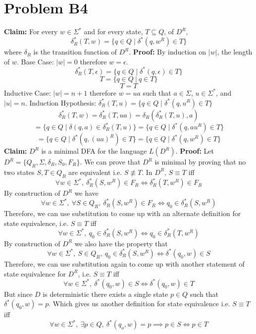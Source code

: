 \documentclass[12pt]{article}
\begin{document}
\section*{Problem B4}
\textbf{Claim: } For every $w \in \Sigma^*$ and for every state, $T\subseteq Q$,
of $D^R$,
$$\delta_R^*(T, w) = \{q\in Q \mid \delta^*(q, w^R) \in T\}$$
where $\delta_R$ is the transition function of $D^R$.
\newline
\textbf{Proof: } By induction on $|w|$, the length of $w$.
\newline
Base Case: $|w|= 0$ therefore $w = \epsilon$.
$$\delta_R^*(T, \epsilon) = \{q\in Q \mid \delta^*(q, \epsilon) \in T\}$$
$$T = \{q \in Q\ |\ q \in T\}$$
$$T = T$$
\newline
Inductive Case: $|w| = n+1$ therefore $w = ua$ such that $a \in \Sigma$,
$u \in \Sigma^*$, and $|u| = n$.
Induction Hypothesis: $\delta_R^*(T, u) = \{q\in Q \mid \delta^*(q, u^R) \in T\}$
$$\delta_R^*(T, w) = \delta_R^*(T, ua) = \delta_R(\delta_R^*(T,u),a)$$
$$= \{q \in Q \mid \delta(q,a) \in \delta_R^*(T,u)\} =
\{q\in Q \mid \delta^*(q, au^R) \in T\}$$
$$= \{q\in Q \mid \delta^*(q, (ua)^R) \in T\} =
\{q\in Q \mid \delta^*(q, w^R) \in T\}$$
\medskip
\newline
\textbf{Claim: } $D^R$ is a minimal DFA for the language $L(D^R)$.
\newline
\textbf{Proof: } Let $D^R = \{Q_R, \Sigma, \delta_R, S_0, F_R\}$. We can prove
that $D^R$ is minimal by proving that no two states $S, T \in Q_R$ are
equivalent i.e. $S \not\equiv T$. In $D^R$, $S \equiv T$ iff
$$ \forall w \in \Sigma^*,\ \delta_R^*(S,w^R) \in F_R \iff
\delta_R^*(T,w^R) \in F_R$$
By construction of $D^R$ we have
$$ \forall w \in \Sigma^*,\ \forall S \in Q_R,\ \delta_R^*(S, w^R) \in F_R \iff
q_0 \in \delta_R^*(S, w^R)$$
Therefore, we can use substitution to come up with an alternate definition for
state equivalence, i.e. $S \equiv T$ iff
$$ \forall w \in \Sigma^*,\ q_0 \in \delta_R^*(S, w^R) \iff
q_0 \in \delta_R^*(T, w^R)$$
By construction of $D^R$ we also have the property that
$$ \forall w \in \Sigma^*,\ S \in Q_R,\ q_0 \in \delta_R^*(S, w^R) \iff
\delta^*(q_0, w) \in S$$
Therefore, we can use substitution again to come up with another statement
of state equivalence for $D^R$, i.e. $ S \equiv T$ iff
$$ \forall w \in \Sigma^*,\ \delta^*(q_0, w) \in S \iff \delta^*(q_0, w) \in T$$
But since $D$ is deterministic there exists a single state $p \in Q$ such
that $\delta^*(q_0, w) = p$. Which gives us another definition for state
equivalence i.e. $S \equiv T$ iff
$$ \forall w \in \Sigma^*,\ \exists p \in Q,\ \delta^*(q_o,w) = p \implies
p \in S \iff p \in T$$
\end{document}
